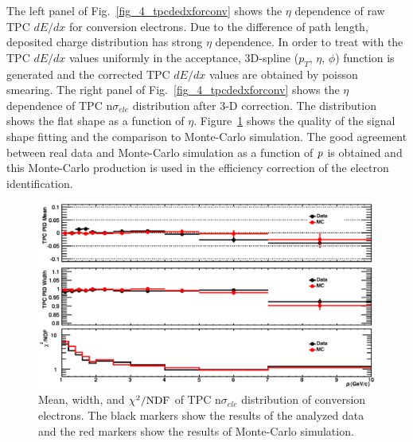 {The left panel of Fig.~\ref{fig_4_tpcdedxforconv} shows the $\eta$ dependence of raw TPC $dE/dx$ for conversion electrons. 
Due to the difference of path length, deposited charge distribution has strong $\eta$ dependence. 
In order to treat with the TPC $dE/dx$ values uniformly in the acceptance, 3D-spline ($p_{T}$, $\eta$, $\phi$) function is generated and the corrected TPC $dE/dx$ values are obtained by poisson smearing. 
The right panel of Fig.~\ref{fig_4_tpcdedxforconv} shows the $\eta$ dependence of TPC n$\sigma_{ele}$ distribution after 3-D correction.  
The distribution shows the flat shape as a function of $\eta$.  
Figure~\ref{fig_4_tpc_pidfit} shows the quality of the signal shape fitting and the comparison to Monte-Carlo simulation. 
The good agreement between real data and Monte-Carlo simulation as a function of $\it{p}$ is obtained and this Monte-Carlo production is used in the efficiency correction of the electron identification.  
\begin{figure}[!h]
  \centering
  \includegraphics[width=12cm]{chap4/figure/PID/ConvFit_AddEtaCorr_MB.eps}
  \caption{Mean, width, and $\chi^{2}/\rm{NDF}$ of TPC n$\sigma_{ele}$ distribution of conversion electrons. The black markers show the results of the analyzed data and the red markers show the results of Monte-Carlo simulation.}
  \label{fig_4_tpc_pidfit}
\end{figure}


}
